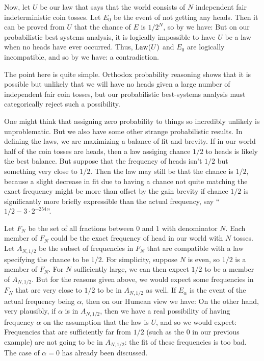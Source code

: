 Now, let $U$ be our law that says that the world consists of $N$ independent fair indeterministic coin tosses. Let $E_0$ be the event
of not getting any heads. Then it can be proved from $U$ that the chance of $E$ is $1/2^N$, so by  we have:
But on our probabilistic best systems analysis, it is logically impossible to have $U$ be a law when no heads have ever occurred.
Thus, $\operatorname{Law}(U)$ and $E_0$ are logically incompatible, and so by  we have:
a contradiction.

The point here is quite simple. Orthodox probability reasoning shows that it is possible but unlikely that we will have no heads given
a large number of independent fair coin tosses, but our probabilistic best-systems analysis must categorically reject such a possibility.

One might think that assigning zero probability to things so incredibly unlikely is unproblematic. But we also have some other strange
probabilistic results. In defining the laws, we are maximizing a balance of fit and brevity. If in our world half of the coin tosses 
are heads, then a law assiging chance $1/2$ to heads is likely the best balance. But suppose that the frequency of heads isn't $1/2$
but something very close to $1/2$. Then the law may still be that the chance is $1/2$, because a slight decrease in fit due to having
a chance not quite matching the exact frequency might be more than offset by the gain brevity if chance $1/2$ is significantly more
briefly expressible than the actual frequency, say ``$1/2-3\cdot 2^{-254}$''. 

Let $F_N$ be the set of all fractions between $0$ and $1$ with denominator $N$. Each member of $F_N$ could be the exact frequency
of head  in our world with $N$ tosses. Let $A_{N,1/2}$ be the subset of frequencies in $F_N$ that are compatible with a law specifying
the chance to be $1/2$. For simplicity, suppose $N$ is even, so $1/2$ is a member of $F_N$. For $N$ sufficiently large, we can then 
expect $1/2$ to be a member of $A_{N,1/2}$. But for the reasons given above, we would expect some frequencies in $F_N$ that are very
close to $1/2$ to be in $A_{N,1/2}$ as well. If $E_\alpha$ is the event of the actual frequency being $\alpha$, then on our Humean
view we have:
On the other hand, very plausibly, if $\alpha$ is in $A_{N,1/2}$, then we have a real possibility of having frequency $\alpha$
on the assumption that the law is $U$, and so we would expect:
Frequencies that are sufficiently far from $1/2$ (such as the $0$ in our previous example) are not going to be in $A_{N,1/2}$: the fit 
of these frequencies is too bad. The case of $\alpha=0$ has already been discussed.

